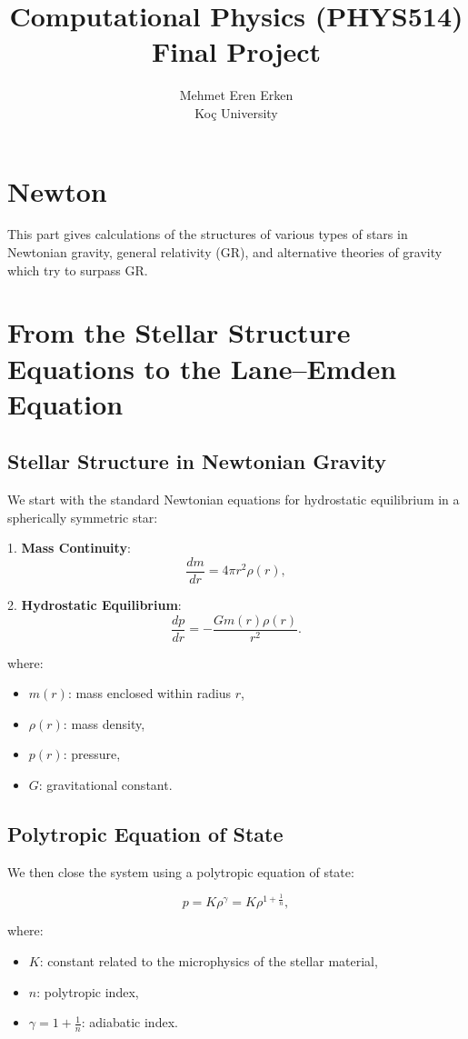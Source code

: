 \documentclass{article}
\title{Computational Physics (PHYS514) Final Project}
\author{Mehmet Eren Erken \\
Koç University}
\date{}
\begin{document}
\maketitle

\section*{Newton}

This part gives calculations of the structures of various types of stars in Newtonian gravity, general relativity (GR), and alternative theories of gravity which try to surpass GR.

\section{From the Stellar Structure Equations to the Lane–Emden Equation}

\subsection{Stellar Structure in Newtonian Gravity}

We start with the standard Newtonian equations for hydrostatic equilibrium in a spherically symmetric star:

1. \textbf{Mass Continuity}:
   \[
   \frac{dm}{dr} = 4\pi r^2 \rho(r),
   \]

2. \textbf{Hydrostatic Equilibrium}:
   \[
   \frac{dp}{dr} = -\frac{G m(r) \rho(r)}{r^2}.
   \]

where:
\begin{itemize}
    \item \( m(r) \): mass enclosed within radius \( r \),
    \item \( \rho(r) \): mass density,
    \item \( p(r) \): pressure,
    \item \( G \): gravitational constant.
\end{itemize}

\subsection{Polytropic Equation of State}

We then close the system using a polytropic equation of state:

\[
p = K \rho^\gamma = K \rho^{1 + \tfrac{1}{n}},
\]

where:
\begin{itemize}
    \item \( K \): constant related to the microphysics of the stellar material,
    \item \( n \): polytropic index,
    \item \(\gamma = 1 + \frac{1}{n}\): adiabatic index.
\end{itemize}
\end{document}
